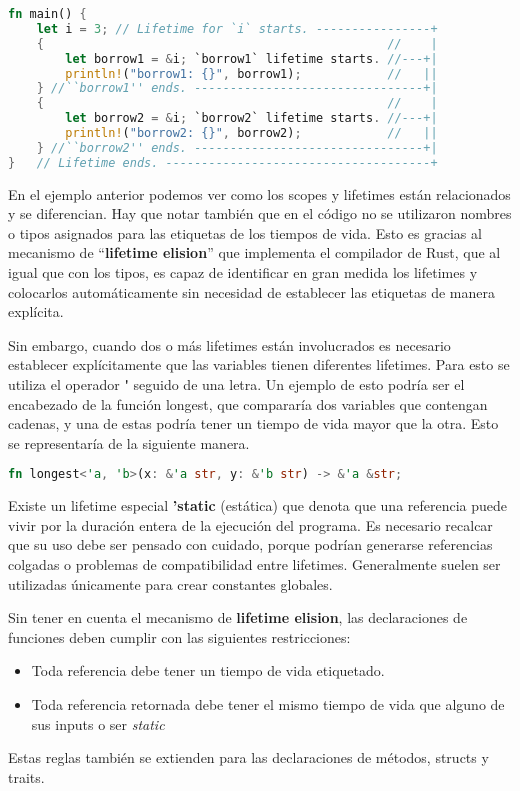 \begin{lstlisting}[language=Rust]
fn main() {
    let i = 3; // Lifetime for `i` starts. ----------------+
    {                                                //    |
        let borrow1 = &i; `borrow1` lifetime starts. //---+|
        println!("borrow1: {}", borrow1);            //   ||
    } //``borrow1'' ends. --------------------------------+|
    {                                                //    |
        let borrow2 = &i; `borrow2` lifetime starts. //---+|
        println!("borrow2: {}", borrow2);            //   ||
    } //``borrow2'' ends. --------------------------------+|
}   // Lifetime ends. -------------------------------------+

\end{lstlisting}

En el ejemplo anterior podemos ver como los scopes y lifetimes están relacionados y se diferencian. Hay que notar también que en el código no se utilizaron nombres o tipos asignados para las etiquetas de los tiempos de vida. Esto es gracias al mecanismo de ``\textbf{lifetime elision}'' que implementa el compilador de Rust, que al igual que con los tipos, es capaz de identificar en gran medida los lifetimes y colocarlos automáticamente sin necesidad de establecer las etiquetas de manera explícita.

Sin embargo, cuando dos o más lifetimes están involucrados es necesario establecer explícitamente que las variables tienen diferentes lifetimes. Para esto se utiliza el operador \textbf{\'} seguido de una letra. Un ejemplo de esto podría ser el encabezado de la función longest, que compararía dos variables que contengan cadenas, y una de estas podría tener un tiempo de vida mayor que la otra. Esto se representaría de la siguiente manera.

\begin{lstlisting}[language=Rust]
    fn longest<'a, 'b>(x: &'a str, y: &'b str) -> &'a &str;
\end{lstlisting}

Existe un lifetime especial \textbf{'static} (estática) que denota que una referencia puede vivir por la duración entera de la ejecución del programa. Es necesario recalcar que su uso debe ser pensado con cuidado, porque podrían generarse referencias colgadas o problemas de compatibilidad entre lifetimes. Generalmente suelen ser utilizadas únicamente para crear constantes globales.

Sin tener en cuenta el mecanismo de \textbf{lifetime elision}, las declaraciones de funciones deben cumplir con las siguientes restricciones:
\begin{itemize}
    \item Toda referencia debe tener un tiempo de vida etiquetado.
    \item Toda referencia retornada debe tener el mismo tiempo de vida que alguno de sus inputs o ser \textit{static}
\end{itemize}
Estas reglas también se extienden para las declaraciones de métodos, structs y traits.

